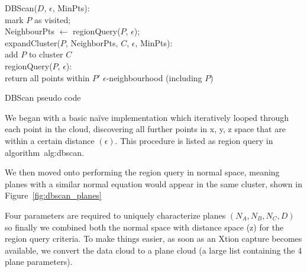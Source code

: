 \documentclass[]{article}
\begin{document}
{\begin{algorithm}[tb]
	\SetAlgoLined
	\bigskip
	DBScan($D$, $\epsilon$, MinPts): \\
	{
		mark $P$ as visited; \\
		NeighbourPts $\leftarrow$ regionQuery($P$, $\epsilon$); \\
	}
	\bigskip
	expandCluster($P$, NeighborPts, $C$, $\epsilon$, MinPts):  \\
	add $P$ to cluster $C$ \\
	\bigskip
	regionQuery($P$, $\epsilon$):  \\
	{
 		return all points within $P'$ $\epsilon$-neighbourhood (including $P$)
	}
	\bigskip
	\caption{\ac{DBScan} pseudo code}
	\label{alg:dbscan}
\end{algorithm}

We began with a basic naïve implementation which iteratively looped through each point in the cloud, discovering all further points in x, y, z space that are within a certain distance  $(\epsilon)$. This procedure is listed as region query in algorithm~{alg:dbscan}.



We then moved onto performing the region query in normal space, meaning planes with a similar normal equation would appear in the same cluster, shown in Figure~\ref{fig:dbscan_planes}



Four parameters are required to uniquely characterize planes $(N_A, N_B, N_C, D)$ so finally we combined both the normal space with distance space (z) for the region query criteria. To make things easier, as soon as an Xtion capture becomes available, we convert the data cloud to a plane cloud (a large list containing the 4 plane parameters).

}
\end{document}
